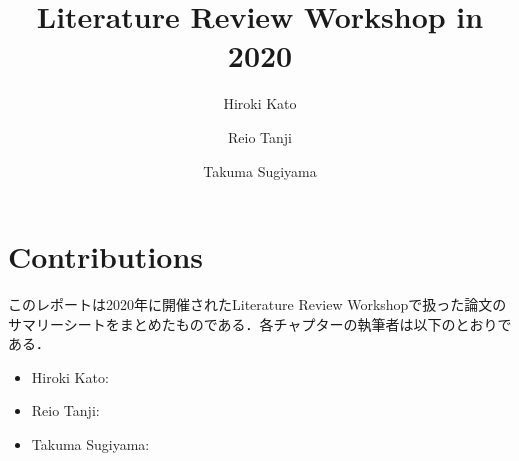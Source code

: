 \documentclass[12pt, a4paper, titlepage]{report}
\title{Literature Review Workshop in 2020}
\author{Hiroki Kato \and Reio Tanji \and Takuma Sugiyama}
\def\biblio{}
\begin{document}
    \def\biblio{}

    \maketitle

    \chapter*{Contributions}

    このレポートは2020年に開催されたLiterature Review Workshopで扱った論文のサマリーシートをまとめたものである．各チャプターの執筆者は以下のとおりである．
    \begin{itemize}
        \item Hiroki Kato:
        \item Reio Tanji:
        \item Takuma Sugiyama:
    \end{itemize}


    \clearpage

    \tableofcontents
    \clearpage

    

    
    
\end{document}
